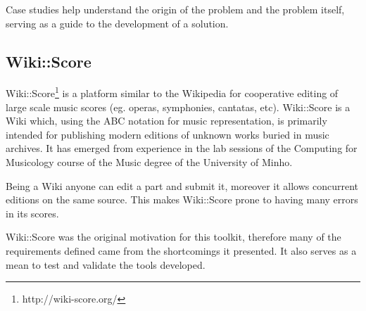 Case studies help understand the origin of the problem and the problem itself, serving as a guide to
the development of a solution.

\subsection*{Wiki::Score}

Wiki::Score\cite{almeida2012wiki}\footnote{http://wiki-score.org/} is a platform similar to the
Wikipedia for cooperative editing of large scale music scores (eg. operas, symphonies, cantatas,
etc). Wiki::Score is a Wiki which, using the ABC notation for music representation, is primarily
intended for publishing modern editions of unknown works buried in music archives. It has emerged
from experience in the lab sessions of the Computing for Musicology course of the Music degree of
the University of Minho.

Being a Wiki anyone can edit a part and submit it, moreover it allows concurrent editions on the
same source. This makes Wiki::Score prone to having many errors in its scores.

Wiki::Score was the original motivation for this toolkit, therefore many of the requirements defined
came from the shortcomings it presented. It also serves as a mean to test and validate the tools
developed.
